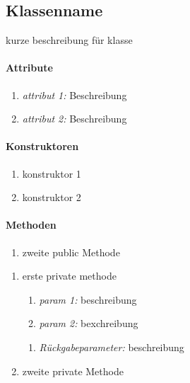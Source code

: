\subsection{Klassenname}
kurze beschreibung für klasse

\paragraph{Attribute}
\begin{enumerate}[$\bullet$]
\item \textit{attribut 1:} Beschreibung
\item \textit{attribut 2:} Beschreibung
\end{enumerate}

\paragraph{Konstruktoren}
\begin{enumerate}[+]
\item konstruktor 1
\item konstruktor 2
\end{enumerate}

\paragraph{Methoden}

\vspace{-0.2cm}
\begin{enumerate}[$\circ$]

\item zweite public Methode
\end{enumerate}

\begin{enumerate}[$-$]
\item erste private methode

\begin{enumerate}[$\bullet$]
\item \textit{param 1:} beschreibung
\item \textit{param 2:} bexchreibung
\end{enumerate}
\vspace{-0.2cm}
\begin{enumerate}[$\circ$]
\item \textit{Rückgabeparameter:} beschreibung
\end{enumerate}

\item zweite private Methode
\end{enumerate}